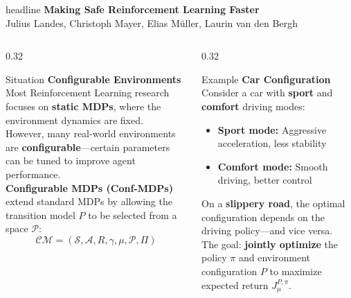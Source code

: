 \documentclass[final,t]{beamer}
\newcommand{\postertitle}{Making Safe Reinforcement Learning Faster}
\newcommand{\posterauthors}{Julius Landes, Christoph Mayer, Elias M\"uller, Laurin van den Bergh}
\begin{document}
\begin{frame}[t]

\vspace{-1cm}
\begin{beamercolorbox}[wd=\textwidth,ht=7cm,center]{headline}
\vspace{1cm}
{\Huge\textbf{\postertitle}}\\[0.8cm]
{\Large \posterauthors}
\end{beamercolorbox}

\vspace{0.5cm}

\begin{columns}[T]

\begin{column}{0.32\textwidth}
\begin{block}{Situation}
\textbf{Configurable Environments}\\[0.3cm]
Most Reinforcement Learning research focuses on \textbf{static MDPs}, where the environment dynamics are fixed.\\[0.3cm]
However, many real-world environments are \textbf{configurable}---certain parameters can be tuned to improve agent performance.\\[0.3cm]
\textbf{Configurable MDPs (Conf-MDPs)} extend standard MDPs by allowing the transition model $P$ to be selected from a space $\mathcal{P}$:
\[
\mathcal{CM} = (\mathcal{S}, \mathcal{A}, R, \gamma, \mu, \mathcal{P}, \Pi)
\]
\end{block}
\end{column}

\begin{column}{0.32\textwidth}
\begin{block}{Example}
\textbf{Car Configuration}\\[0.3cm]
Consider a car with \textbf{sport} and \textbf{comfort} driving modes:
\begin{itemize}
    \item \textbf{Sport mode:} Aggressive acceleration, less stability
    \item \textbf{Comfort mode:} Smooth driving, better control
\end{itemize}
\vspace{0.3cm}
On a \textbf{slippery road}, the optimal configuration depends on the driving policy---and vice versa.\\[0.3cm]
The goal: \textbf{jointly optimize} the policy $\pi$ and environment configuration $P$ to maximize expected return $J_\mu^{P,\pi}$.
\end{block}
\end{column}


\end{columns}
\end{frame}
\end{document}
